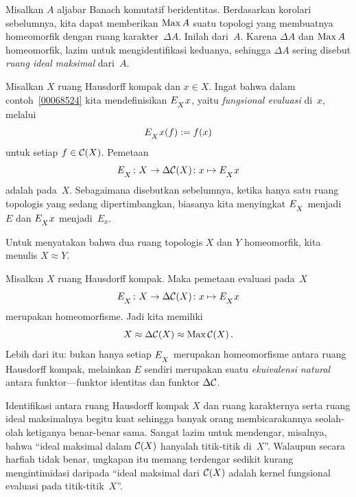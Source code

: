 \begin{defn} Misalkan $A$ aljabar Banach komutatif beridentitas. Berdasarkan korolari sebelumnya,
kita dapat memberikan $\operatorname{Max} A$ suatu topologi yang membuatnya homeomorfik dengan ruang karakter~$\Delta A$.
Inilah
 dari~$A$. Karena $\Delta A$ dan $\operatorname{Max} A$ homeomorfik, lazim untuk
mengidentifikasi keduanya, sehingga $\Delta A$ sering disebut \emph{ruang ideal maksimal} dari~$A$.
\end{defn}

\begin{defn}\label{00073} Misalkan $X$ ruang Hausdorff kompak dan $x \in X$.
Ingat bahwa dalam contoh~\ref{00068524} kita mendefinisikan $E_{{}_{\scriptstyle{X}}}x$, yaitu \emph{fungsional
evaluasi} di~$x$, melalui
   \[ E_{{}_{\scriptstyle{X}}}x(f) := f(x) \]
untuk setiap $f \in \mathcal{C}(X)$. Pemetaan
   \[ E_{{}_{\scriptstyle{X}}} \colon X \rightarrow \Delta\mathcal{C}(X)\colon x \mapsto E_{{}_{\scriptstyle{X}}}x \]
adalah
 pada~$X$. Sebagaimana disebutkan sebelumnya, ketika hanya satu ruang topologis
yang sedang dipertimbangkan, biasanya kita menyingkat $E_{{}_{\scriptstyle{X}}}$ menjadi $E$ dan $E_{{}_{\scriptstyle{X}}}x$ menjadi~$E_x$.
\end{defn}

\begin{notn} Untuk menyatakan bahwa dua ruang topologis $X$ dan $Y$ homeomorfik, kita
menulis $X \approx Y$.
\end{notn}

\begin{prop}\label{000731} Misalkan $X$ ruang Hausdorff kompak. Maka
pemetaan evaluasi pada~$X$
   \[ E_{{}_{\scriptstyle{X}}} \colon X \rightarrow \Delta\mathcal{C}(X) \colon x \mapsto E_{{}_{\scriptstyle{X}}}x \]
merupakan homeomorfisme. Jadi kita memiliki
   \[ X \approx \Delta\mathcal{C}(X) \approx \operatorname{Max}\mathcal{C}(X)\,. \]
Lebih dari itu: bukan hanya setiap $E_{{}_{\scriptstyle{X}}}$ merupakan homeomorfisme antara ruang Hausdorff kompak,
melainkan $E$ sendiri merupakan suatu \emph{ekuivalensi natural} antara funktor---funktor identitas
dan funktor $\Delta\mathcal{C}$.
\end{prop}

Identifikasi antara ruang Hausdorff kompak $X$ dan ruang karakternya serta ruang ideal maksimalnya
begitu kuat sehingga banyak orang membicarakannya seolah-olah ketiganya benar-benar sama. Sangat lazim
untuk mendengar, misalnya, bahwa ``ideal maksimal dalam $\mathcal{C}(X)$ hanyalah titik-titik di~$X$''.
Walaupun secara harfiah tidak benar, ungkapan itu memang terdengar sedikit kurang mengintimidasi daripada
``ideal maksimal dari $\mathcal{C}(X)$ adalah kernel fungsional evaluasi pada titik-titik~$X$''.

